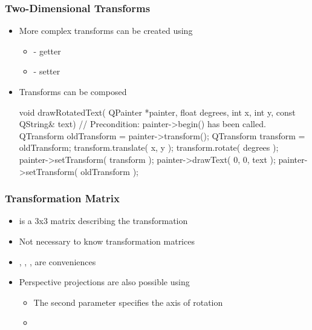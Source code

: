 \begin{slide}[fragile]\frametitle{Two-Dimensional Transforms}
\begin{itemize}
\item More complex transforms can be created using 
  \begin{itemize}
  \item {} - getter
  \item {} - setter
  \end{itemize}
\item Transforms can be composed
\begin{cpp}
void drawRotatedText( QPainter *painter, float degrees,
int x, int y, const QString& text)
{
    // Precondition: painter->begin() has been called.
    QTransform oldTransform = painter->transform();
    QTransform transform = oldTransform;
    transform.translate( x, y );
    transform.rotate( degrees );
    painter->setTransform( transform );
    painter->drawText( 0, 0, text );
    painter->setTransform( oldTransform );
}
\end{cpp}
\end{itemize}
\end{slide}

\begin{slide}[fragile]\frametitle{Transformation Matrix}
\begin{itemize}
\item {} is a 3x3 matrix describing the transformation
\item Not necessary to know transformation matrices
\item {}, , ,  are conveniences
\item Perspective projections are also possible using 
  \begin{itemize}
  \item The second parameter specifies the axis of rotation
  \item {}
  \end{itemize}
\end{itemize}
\end{slide}

